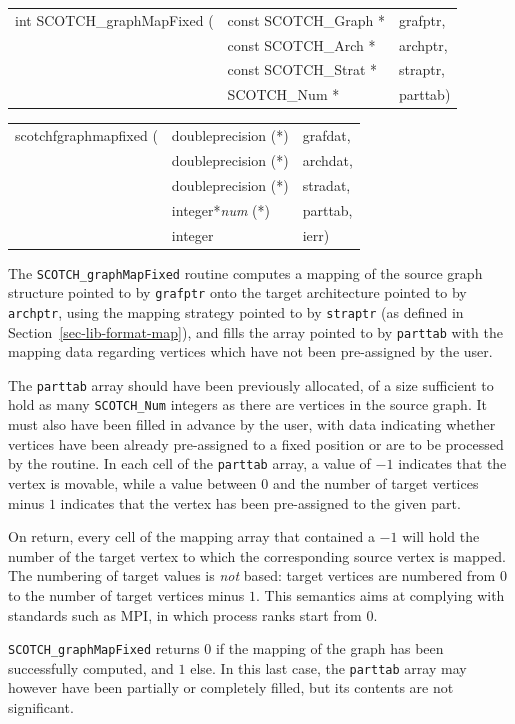 \begin{itemize}
\progsyn

{\tt\begin{tabular}{l@{}ll}
int SCOTCH\_graphMapFixed ( & const SCOTCH\_Graph * & grafptr, \\
                            & const SCOTCH\_Arch *  & archptr, \\
                            & const SCOTCH\_Strat * & straptr, \\
                            & SCOTCH\_Num *         & parttab)
\end{tabular}}

{\tt\begin{tabular}{l@{}ll}
scotchfgraphmapfixed ( & doubleprecision (*)   & grafdat, \\
                       & doubleprecision (*)   & archdat, \\
                       & doubleprecision (*)   & stradat, \\
                       & integer*{\it num} (*) & parttab, \\
                       & integer               & ierr)
\end{tabular}}

\progdes

The {\tt SCOTCH\_graphMapFixed} routine computes a mapping of the
source graph structure pointed to by {\tt grafptr} onto the target
architecture pointed to by {\tt archptr}, using the mapping strategy
pointed to by {\tt straptr} (as defined in
Section~\ref{sec-lib-format-map}), and fills the array pointed to by
{\tt parttab} with the mapping data regarding vertices which have not
been pre-assigned by the user.

The {\tt parttab} array should have been previously allocated, of a
size sufficient to hold as many {\tt SCOTCH\_\lbt Num} integers as
there are vertices in the source graph. It must also have been filled
in advance by the user, with data indicating whether vertices have
been already pre-assigned to a fixed position or are to be processed
by the routine. In each cell of the {\tt parttab} array, a value of
$-1$ indicates that the vertex is movable, while a value between $0$
and the number of target vertices minus $1$ indicates that the vertex
has been pre-assigned to the given part.

On return, every cell of the mapping array that contained a $-1$ will
hold the number of the target vertex to which the corresponding source
vertex is mapped. The numbering of target values is {\em not\/}
based: target vertices are numbered from $0$ to the number of target
vertices minus $1$. This semantics aims at complying with standards
such as MPI, in which process ranks start from $0$.

\progret

{\tt SCOTCH\_graphMapFixed} returns $0$ if the mapping of the graph
has been successfully computed, and $1$ else. In this last case, the
{\tt parttab} array may however have been partially or completely
filled, but its contents are not significant.
\end{itemize}

